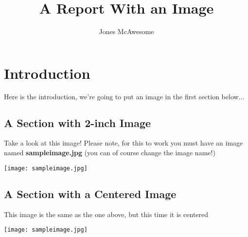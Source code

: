 \documentclass{report}
\title{A Report With an Image}
\author{Jones McAwesome}
\begin{document}
\maketitle
\tableofcontents

\chapter{Introduction}
Here is the introduction, we're going to put an image in the first section below...

\section{A Section with 2-inch Image}
Take a look at this image! Please note, for this to work you must have an image named {\bf sampleimage.jpg} (you can of course change the image name!)

\texttt{[image: sampleimage.jpg]}


\section{A Section with a Centered Image}
This image is the same as the one above, but this time it is centered

\begin{center}
\texttt{[image: sampleimage.jpg]}
\end{center}
\end{document}
